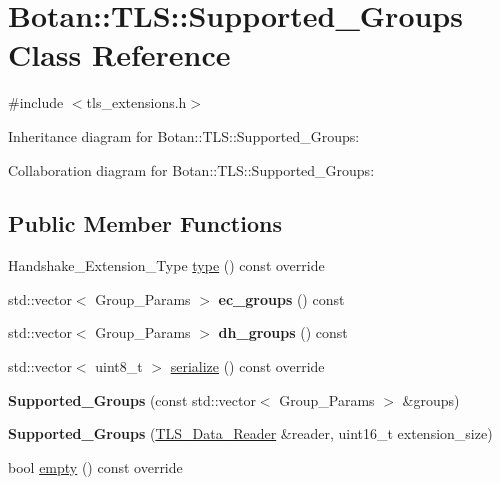 \hypertarget{class_botan_1_1_t_l_s_1_1_supported___groups}{}\section{Botan\+:\+:T\+LS\+:\+:Supported\+\_\+\+Groups Class Reference}
\label{class_botan_1_1_t_l_s_1_1_supported___groups}


{\ttfamily \#include $<$tls\+\_\+extensions.\+h$>$}



Inheritance diagram for Botan\+:\+:T\+LS\+:\+:Supported\+\_\+\+Groups\+:


Collaboration diagram for Botan\+:\+:T\+LS\+:\+:Supported\+\_\+\+Groups\+:
\subsection*{Public Member Functions}
\begin{DoxyCompactItemize}
\item 
Handshake\+\_\+\+Extension\+\_\+\+Type \mbox{\hyperlink{class_botan_1_1_t_l_s_1_1_supported___groups_ab3126c91ffe1b598019892ed08117a67}{type}} () const override
\item 
\mbox{\label{class_botan_1_1_t_l_s_1_1_supported___groups_a1757799529d8fec85b1023d2da7f4566}} 
std\+::vector$<$ Group\+\_\+\+Params $>$ {\bfseries ec\+\_\+groups} () const
\item 
\mbox{\label{class_botan_1_1_t_l_s_1_1_supported___groups_a9a10d5db52125db9a22e8405de284fb9}} 
std\+::vector$<$ Group\+\_\+\+Params $>$ {\bfseries dh\+\_\+groups} () const
\item 
std\+::vector$<$ uint8\+\_\+t $>$ \mbox{\hyperlink{class_botan_1_1_t_l_s_1_1_supported___groups_a013f5094de8ead5c72eb9f9f4adb9481}{serialize}} () const override
\item 
\mbox{\label{class_botan_1_1_t_l_s_1_1_supported___groups_a14d8896db80eed02a4d315d5b2562c4d}} 
{\bfseries Supported\+\_\+\+Groups} (const std\+::vector$<$ Group\+\_\+\+Params $>$ \&groups)
\item 
\mbox{\label{class_botan_1_1_t_l_s_1_1_supported___groups_a7166ee349b67d19ceedf02f69cd56b75}} 
{\bfseries Supported\+\_\+\+Groups} (\mbox{\hyperlink{class_botan_1_1_t_l_s_1_1_t_l_s___data___reader}{T\+L\+S\+\_\+\+Data\+\_\+\+Reader}} \&reader, uint16\+\_\+t extension\+\_\+size)
\item 
bool \mbox{\hyperlink{class_botan_1_1_t_l_s_1_1_supported___groups_a00ea6c535e6d7198cf6b74c1fb4fe71a}{empty}} () const override
\end{DoxyCompactItemize}
